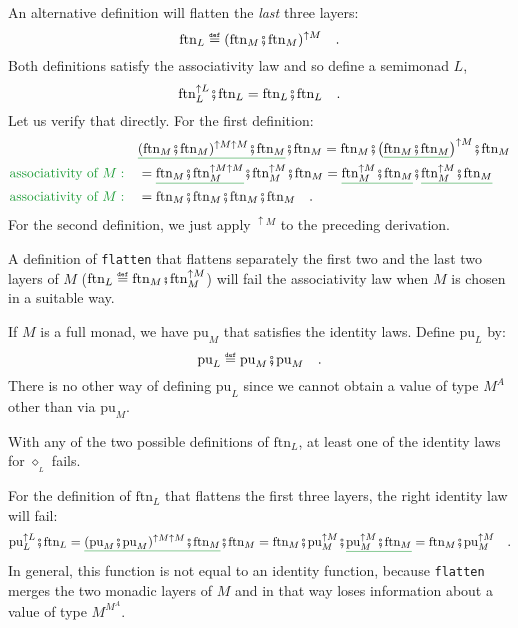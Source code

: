 An alternative definition will flatten the \emph{last} three layers:
\[
\text{ftn}_{L}\triangleq(\text{ftn}_{M}\bef\text{ftn}_{M})^{\uparrow M}\quad.
\]
Both definitions satisfy the associativity law and so define a semimonad
$L$,
\[
\text{ftn}_{L}^{\uparrow L}\bef\text{ftn}_{L}=\text{ftn}_{L}\bef\text{ftn}_{L}\quad.
\]
Let us verify that directly. For the first definition:
\begin{align*}
 & \gunderline{(\text{ftn}_{M}\bef\text{ftn}_{M})^{\uparrow M\uparrow M}\bef\text{ftn}_{M}}\bef\text{ftn}_{M}=\text{ftn}_{M}\bef\big(\gunderline{\text{ftn}_{M}\bef\text{ftn}_{M}}\big)^{\uparrow M}\bef\text{ftn}_{M}\\
{\color{greenunder}\text{associativity of }M:}\quad & =\gunderline{\text{ftn}_{M}\bef\text{ftn}_{M}^{\uparrow M\uparrow M}}\bef\text{ftn}_{M}^{\uparrow M}\bef\text{ftn}_{M}=\gunderline{\text{ftn}_{M}^{\uparrow M}\bef\text{ftn}_{M}}\bef\gunderline{\text{ftn}_{M}^{\uparrow M}\bef\text{ftn}_{M}}\\
{\color{greenunder}\text{associativity of }M:}\quad & =\text{ftn}_{M}\bef\text{ftn}_{M}\bef\text{ftn}_{M}\bef\text{ftn}_{M}\quad.
\end{align*}
For the second definition, we just apply $^{\uparrow M}$ to the preceding
derivation.

A definition of \lstinline!flatten! that flattens separately the
first two and the last two layers of $M$ ($\text{ftn}_{L}\triangleq\text{ftn}_{M}\bef\text{ftn}_{M}^{\uparrow M}$)
will fail the associativity law when $M$ is chosen in a suitable
way.

If $M$ is a full monad, we have $\text{pu}_{M}$ that satisfies the
identity laws. Define $\text{pu}_{L}$ by:
\[
\text{pu}_{L}\triangleq\text{pu}_{M}\bef\text{pu}_{M}\quad.
\]
There is no other way of defining $\text{pu}_{L}$ since we cannot
obtain a value of type $M^{A}$ other than via $\text{pu}_{M}$.

With any of the two possible definitions of $\text{ftn}_{L}$, at
least one of the identity laws for $\diamond_{_{L}}$ fails.

For the definition of $\text{ftn}_{L}$ that flattens the first three
layers, the right identity law will fail:
\[
\text{pu}_{L}^{\uparrow L}\bef\text{ftn}_{L}=\gunderline{(\text{pu}_{M}\bef\text{pu}_{M})^{\uparrow M\uparrow M}\bef\text{ftn}_{M}}\bef\text{ftn}_{M}=\text{ftn}_{M}\bef\text{pu}_{M}^{\uparrow M}\bef\gunderline{\text{pu}_{M}^{\uparrow M}\bef\text{ftn}_{M}}=\text{ftn}_{M}\bef\text{pu}_{M}^{\uparrow M}\quad.
\]
In general, this function is not equal to an identity function, because
\lstinline!flatten! merges the two monadic layers of $M$ and in
that way loses information about a value of type $M^{M^{A}}$.

